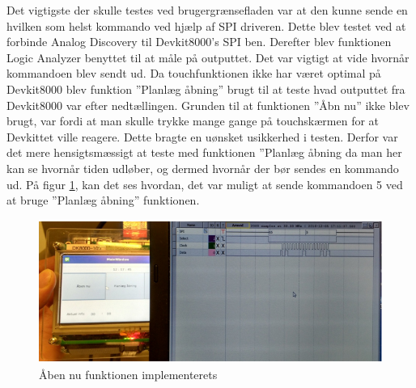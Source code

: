 
Det vigtigste der skulle testes ved brugergrænsefladen var at den kunne sende en hvilken som helst kommando ved hjælp af SPI driveren. Dette blev testet ved at forbinde Analog Discovery til Devkit8000’s SPI ben. Derefter blev funktionen Logic Analyzer benyttet til at måle på outputtet. Det var vigtigt at vide hvornår kommandoen blev sendt ud. Da touchfunktionen ikke har været optimal på Devkit8000 blev funktion ”Planlæg åbning” brugt til at teste hvad outputtet fra Devkit8000 var efter nedtællingen. Grunden til at funktionen ”Åbn nu” ikke blev brugt, var fordi at man skulle trykke mange gange på touchskærmen for at Devkittet ville reagere. Dette bragte en uønsket usikkerhed i testen. Derfor var det mere hensigtsmæssigt at teste med funktionen ”Planlæg åbning da man her kan se hvornår tiden udløber, og dermed hvornår der bør sendes en kommando ud. På figur \ref{PAA}, kan det ses hvordan, det var muligt at sende kommandoen 5 ved at bruge ”Planlæg åbning” funktionen. 

\begin{figure}[H]
	\includegraphics[scale=1]{tex/Test/GUI-Test/Billeder/test_GUI}
	\caption{Åben nu funktionen implementerets}
	\label{PAA}
\end{figure}

